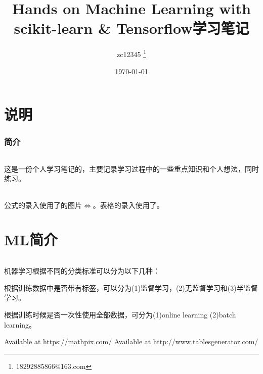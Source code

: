 \documentclass[UTF8]{ctexart}
\title{Hands on Machine Learning with scikit-learn \& Tensorflow学习笔记}
\author{zc12345 \thanks{18292885866@163.com}}
\date\today
\begin{document}
\begin{titlepage}
\maketitle
\end{titlepage}

\tableofcontents

\part{说明}

\section{简介}
\paragraph{}
这是一份个人学习笔记的，主要记录学习过程中的一些重点知识和个人想法，同时练习。
\paragraph{}
公式的录入使用了\cite{mathpix}的图片$\Leftrightarrow$。表格的录入使用了\cite{tablesgenerator}。

\part{ML简介}
\paragraph{}
机器学习根据不同的分类标准可以分为以下几种：
\subparagraph{}
根据训练数据中是否带有标签，可以分为(1)监督学习，(2)无监督学习和(3)半监督学习。
\subparagraph{}
根据训练时候是否一次性使用全部数据，可分为(1)online learning (2)batch learning。


\begin{comment}
don't show in text
\end{comment}

\renewcommand\refname{参考文献}
\begin{thebibliography}{99}
     Available at https://mathpix.com/
      Available at http://www.tablesgenerator.com/
\end{thebibliography}

\end{document}
